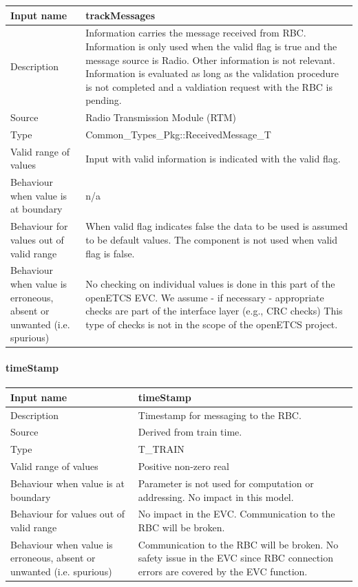 \begin{longtable}{p{}p{}}
\toprule
Input name				& trackMessages \\
\midrule
Description				& Information carries the message received from RBC. Information is only used when the valid flag is true and the message source is Radio. Other information is not relevant. Information is evaluated as long as the validation procedure is not completed and a valdiation request with the RBC is pending. \\
\midrule
Source					& Radio Transmission Module (RTM)\\ 
\midrule
Type					& Common\_Types\_Pkg::ReceivedMessage\_T \\
\midrule
Valid range of values	& Input with valid information is indicated with the valid flag.\\
\midrule
Behaviour when value is at boundary	& n/a\\
\midrule
Behaviour for values out of valid range	& 
When valid flag indicates false the data to be used is assumed to be default values. The component is not used when valid flag is false.\\
\midrule
Behaviour when value is erroneous, absent or unwanted (i.e. spurious) & 
No checking on individual values is done in this part of the openETCS EVC. We assume - if necessary - appropriate checks are part of the interface layer (e.g., CRC checks) This type of checks is not in the scope of the openETCS project.\\

\bottomrule
\end{longtable}

\paragraph{timeStamp}

\begin{longtable}{p{}p{}}
\toprule
Input name				& timeStamp \\
\midrule
Description				& Timestamp for messaging to the RBC.\\
\midrule
Source					& Derived from train time.\\ 
\midrule
Type					& T\_TRAIN\\
\midrule
Valid range of values	& Positive non-zero real\\
\midrule
Behaviour when value is at boundary	& Parameter is not used for computation or addressing. No impact in this model.\\
\midrule
Behaviour for values out of valid range	& No impact in the EVC. Communication to the RBC will be broken.\\
\midrule
Behaviour when value is erroneous, absent or unwanted (i.e. spurious) & Communication to the RBC will be broken. No safety issue in the EVC since RBC connection errors are covered by the EVC function.
\\
\bottomrule
\end{longtable}


